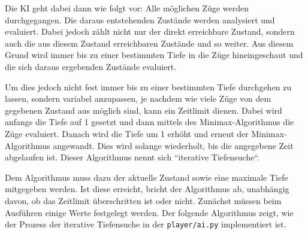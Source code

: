 Die KI geht dabei dann wie folgt vor: Alle möglichen Züge werden
durchgegangen. Die daraus entstehenden Zustände werden analysiert und
evaluiert. Dabei jedoch zählt nicht nur der direkt erreichbare Zustand,
sondern auch die aus diesem Zustand erreichbaren Zustände und so weiter.
Aus diesem Grund wird immer bis zu einer bestimmten Tiefe in die Züge
hineingeschaut und die sich daraus ergebenden Zustände evaluiert.

Um dies jedoch nicht fest immer bis zu einer bestimmten Tiefe durchgehen
zu lassen, sondern variabel anzupassen, je nachdem wie viele Züge von
dem gegebenen Zustand aus möglich sind, kann ein Zeitlimit dienen. Dabei
wird anfangs die Tiefe auf 1 gesetzt und dann mittels des
Minimax-Algorithmus die Züge evaluiert. Danach wird die Tiefe um 1
erhöht und erneut der Minimax-Algorithmus angewandt. Dies wird solange
wiederholt, bis die angegebene Zeit abgelaufen ist. Dieser Algorithmus
nennt sich ``iterative Tiefensuche``.

Dem Algorithmus muss dazu der aktuelle Zustand sowie eine maximale Tiefe
mitgegeben werden. Ist diese erreicht, bricht der Algorithmus ab,
unabhängig davon, ob das Zeitlimit überschritten ist oder nicht.
Zunächst müssen beim Ausführen einige Werte festgelegt werden. Der
folgende Algorithmus zeigt, wie der Prozess der iterative Tiefensuche in
der \texttt{player/ai.py} implementiert ist.

